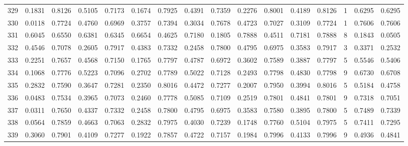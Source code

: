 \begin{tabular}{lrrrrrrrrrrrrrrr}
329 &      0.1831 &  0.8126 &  0.5105 &  0.7173 &  0.1674 &  0.7925 &  0.4391 &  0.7359 &  0.2276 &  0.8001 &   0.4189 &     0.8126 &      1 &                    0.6295 &                     0.6295 \\
330 &      0.0118 &  0.7724 &  0.4760 &  0.6969 &  0.3757 &  0.7394 &  0.3034 &  0.7678 &  0.4723 &  0.7027 &   0.3109 &     0.7724 &      1 &                    0.7606 &                     0.7606 \\
331 &      0.6045 &  0.6550 &  0.6381 &  0.6345 &  0.6654 &  0.4625 &  0.7180 &  0.1805 &  0.7888 &  0.4511 &   0.7181 &     0.7888 &      8 &                    0.1843 &                     0.0505 \\
332 &      0.4546 &  0.7078 &  0.2605 &  0.7917 &  0.4383 &  0.7332 &  0.2458 &  0.7800 &  0.4795 &  0.6975 &   0.3583 &     0.7917 &      3 &                    0.3371 &                     0.2532 \\
333 &      0.2251 &  0.7657 &  0.4568 &  0.7150 &  0.1765 &  0.7797 &  0.4787 &  0.6972 &  0.3602 &  0.7589 &   0.3887 &     0.7797 &      5 &                    0.5546 &                     0.5406 \\
334 &      0.1068 &  0.7776 &  0.5223 &  0.7096 &  0.2702 &  0.7789 &  0.5022 &  0.7128 &  0.2493 &  0.7798 &   0.4830 &     0.7798 &      9 &                    0.6730 &                     0.6708 \\
335 &      0.2832 &  0.7590 &  0.3647 &  0.7281 &  0.2350 &  0.8016 &  0.4472 &  0.7277 &  0.2007 &  0.7950 &   0.3994 &     0.8016 &      5 &                    0.5184 &                     0.4758 \\
336 &      0.0483 &  0.7534 &  0.3965 &  0.7073 &  0.2460 &  0.7778 &  0.5085 &  0.7109 &  0.2519 &  0.7801 &   0.4841 &     0.7801 &      9 &                    0.7318 &                     0.7051 \\
337 &      0.0311 &  0.7650 &  0.4337 &  0.7332 &  0.2458 &  0.7800 &  0.4795 &  0.6975 &  0.3583 &  0.7580 &   0.3895 &     0.7800 &      5 &                    0.7489 &                     0.7339 \\
338 &      0.0564 &  0.7859 &  0.4663 &  0.7063 &  0.2832 &  0.7975 &  0.4030 &  0.7239 &  0.1748 &  0.7760 &   0.5104 &     0.7975 &      5 &                    0.7411 &                     0.7295 \\
339 &      0.3060 &  0.7901 &  0.4109 &  0.7277 &  0.1922 &  0.7857 &  0.4722 &  0.7157 &  0.1984 &  0.7996 &   0.4133 &     0.7996 &      9 &                    0.4936 &                     0.4841 \\

\end{tabular}
